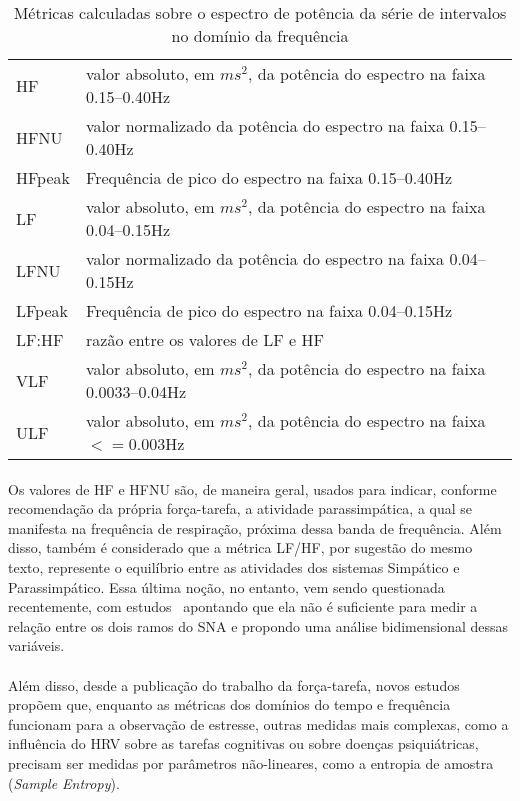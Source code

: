             \begin{table}[ht!]
                \centering
                \caption{Métricas calculadas sobre o espectro de potência da série de intervalos no domínio da frequência}
                \label{freqdomain}
                \begin{tabular}{l | p{8cm}}
                HF & valor absoluto, em $ms^2$, da potência do espectro na faixa 0.15–0.40Hz\\
                HFNU  & valor normalizado da potência do espectro na faixa 0.15–0.40Hz\\
                HFpeak & Frequência de pico do espectro na faixa 0.15–0.40Hz \\
                LF & valor absoluto, em $ms^2$, da potência do espectro na faixa 0.04–0.15Hz \\
                LFNU  & valor normalizado da potência do espectro na faixa 0.04–0.15Hz\\
                LFpeak & Frequência de pico do espectro na faixa 0.04–0.15Hz \\
                LF:HF & razão entre os valores de LF e HF \\
                VLF & valor absoluto, em $ms^2$, da potência do espectro na faixa 0.0033–0.04Hz \\
                ULF & valor absoluto, em $ms^2$, da potência do espectro na faixa $<= 0.003$Hz \\
                \end{tabular}
            \end{table}
            
            \paragraph{} Os valores de HF e HFNU são, de maneira geral, usados para indicar, conforme recomendação da própria força-tarefa, a atividade parassimpática, a qual se manifesta na frequência de respiração, próxima dessa banda de frequência. Além disso, também é considerado que a métrica LF/HF, por sugestão do mesmo texto, represente o equilíbrio entre as atividades dos sistemas Simpático e Parassimpático. Essa última noção, no entanto, vem sendo questionada recentemente, com estudos~\cite{vonRosenberg2017ResolvingHRV, Billman2013TheBalance} apontando que ela não é suficiente para medir a relação entre os dois ramos do SNA e propondo uma análise bidimensional dessas variáveis.
            
            \paragraph{} Além disso, desde a publicação do trabalho da força-tarefa, novos estudos~\cite{Young2015WeMood.} propõem que, enquanto as métricas dos domínios do tempo e frequência funcionam para a observação de estresse, outras medidas mais complexas, como a influência do HRV sobre as tarefas cognitivas ou sobre doenças psiquiátricas, precisam ser medidas por parâmetros não-lineares, como a entropia de amostra (\textit{Sample Entropy}).